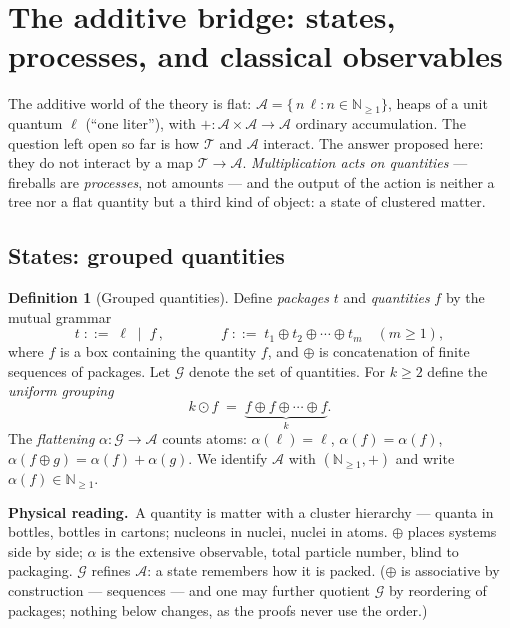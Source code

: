 \documentclass[11pt]{article}
\newcommand{\cT}{\mathcal{T}}   %
\newcommand{\cG}{\mathcal{G}}   %
\newcommand{\cA}{\mathcal{A}}   %
\newcommand{\NN}{\mathbb{N}}
\newcommand{\pkg}[1]{\boxed{#1}}
\newcommand{\physread}{\medskip\noindent\textbf{Physical reading.}\ }
\numberwithin{equation}{section}
\theoremstyle{plain}
\theoremstyle{definition}
\newtheorem{definition}[theorem]{Definition}
\theoremstyle{remark}
\begin{document}
\section{The additive bridge: states, processes, and classical observables}
\label{sec:bridge}

The additive world of the theory is flat: $\cA = \{\,n\,\ell : n \in \NN_{\ge1}\}$,
heaps of a unit quantum $\ell$ (``one liter''), with
$+\colon \cA \times \cA \to \cA$ ordinary accumulation. The question left open so far
is how $\cT$ and $\cA$ interact. The answer proposed here: they do not interact by a
map $\cT \to \cA$. \emph{Multiplication acts on quantities} --- fireballs are
\emph{processes}, not amounts --- and the output of the action is neither a tree nor
a flat quantity but a third kind of object: a state of clustered matter.

\subsection{States: grouped quantities}

\begin{definition}[Grouped quantities]\label{def:grouped}
Define \emph{packages} $t$ and \emph{quantities} $f$ by the mutual grammar
\[
t \;::=\; \ell \;\mid\; \pkg{f}\,,
\qquad\qquad
f \;::=\; t_1 \oplus t_2 \oplus \cdots \oplus t_m \quad (m \ge 1),
\]
where $\pkg{f}$ is a box containing the quantity $f$, and $\oplus$ is concatenation of
finite sequences of packages. Let $\cG$ denote the set of quantities. For $k \ge 2$
define the \emph{uniform grouping}
\[
k \odot f \;=\; \underbrace{\pkg{f} \oplus \pkg{f} \oplus \cdots \oplus \pkg{f}}_{k}.
\]
The \emph{flattening} $\alpha \colon \cG \to \cA$ counts atoms:
$\alpha(\ell) = \ell$, $\alpha(\pkg f) = \alpha(f)$,
$\alpha(f \oplus g) = \alpha(f) + \alpha(g)$. We identify $\cA$ with
$(\NN_{\ge1}, +)$ and write $\alpha(f) \in \NN_{\ge 1}$.
\end{definition}

\physread A quantity is matter with a cluster hierarchy --- quanta in bottles,
bottles in cartons; nucleons in nuclei, nuclei in atoms. $\oplus$ places systems side
by side; $\alpha$ is the extensive observable, total particle number, blind to
packaging. $\cG$ refines $\cA$: a state remembers how it is packed. ($\oplus$ is
associative by construction --- sequences --- and one may further quotient $\cG$ by
reordering of packages; nothing below changes, as the proofs never use the order.)
\end{document}
